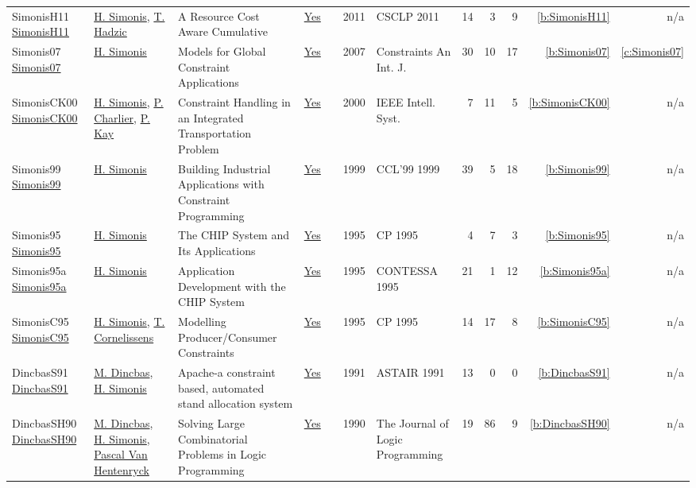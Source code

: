 {\begin{longtable}{>{\raggedright\arraybackslash}p{3cm}>{\raggedright\arraybackslash}p{6cm}>{\raggedright\arraybackslash}p{6.5cm}rrrp{2.5cm}rrrrr}
SimonisH11 \href{http://dx.doi.org/10.1007/978-3-642-19486-3_5}{SimonisH11} & \hyperref[auth:a17]{H. Simonis}, \hyperref[auth:a913]{T. Hadzic} & A Resource Cost Aware Cumulative & \href{../works/SimonisH11.pdf}{Yes} & \cite{SimonisH11} & 2011 & CSCLP 2011 & 14 & 3 & 9 & \ref{b:SimonisH11} & n/a\\
Simonis07 \href{https://doi.org/10.1007/s10601-006-9011-7}{Simonis07} & \hyperref[auth:a17]{H. Simonis} & Models for Global Constraint Applications & \href{../works/Simonis07.pdf}{Yes} & \cite{Simonis07} & 2007 & Constraints An Int. J. & 30 & 10 & 17 & \ref{b:Simonis07} & \ref{c:Simonis07}\\
SimonisCK00 \href{https://doi.org/10.1109/5254.820326}{SimonisCK00} & \hyperref[auth:a17]{H. Simonis}, \hyperref[auth:a893]{P. Charlier}, \hyperref[auth:a894]{P. Kay} & Constraint Handling in an Integrated Transportation Problem & \href{../works/SimonisCK00.pdf}{Yes} & \cite{SimonisCK00} & 2000 & {IEEE} Intell. Syst. & 7 & 11 & 5 & \ref{b:SimonisCK00} & n/a\\
Simonis99 \href{https://doi.org/10.1007/3-540-45406-3_6}{Simonis99} & \hyperref[auth:a17]{H. Simonis} & Building Industrial Applications with Constraint Programming & \href{../works/Simonis99.pdf}{Yes} & \cite{Simonis99} & 1999 & CCL'99 1999 & 39 & 5 & 18 & \ref{b:Simonis99} & n/a\\
Simonis95 \href{https://doi.org/10.1007/3-540-60299-2_42}{Simonis95} & \hyperref[auth:a17]{H. Simonis} & The {CHIP} System and Its Applications & \href{../works/Simonis95.pdf}{Yes} & \cite{Simonis95} & 1995 & CP 1995 & 4 & 7 & 3 & \ref{b:Simonis95} & n/a\\
Simonis95a \href{https://doi.org/10.1007/3-540-60794-3_11}{Simonis95a} & \hyperref[auth:a17]{H. Simonis} & Application Development with the {CHIP} System & \href{../works/Simonis95a.pdf}{Yes} & \cite{Simonis95a} & 1995 & CONTESSA 1995 & 21 & 1 & 12 & \ref{b:Simonis95a} & n/a\\
SimonisC95 \href{https://doi.org/10.1007/3-540-60299-2_27}{SimonisC95} & \hyperref[auth:a17]{H. Simonis}, \hyperref[auth:a305]{T. Cornelissens} & Modelling Producer/Consumer Constraints & \href{../works/SimonisC95.pdf}{Yes} & \cite{SimonisC95} & 1995 & CP 1995 & 14 & 17 & 8 & \ref{b:SimonisC95} & n/a\\
DincbasS91 \href{}{DincbasS91} & \hyperref[auth:a723]{M. Dincbas}, \hyperref[auth:a17]{H. Simonis} & Apache-a constraint based, automated stand allocation system & \href{../works/DincbasS91.pdf}{Yes} & \cite{DincbasS91} & 1991 & ASTAIR 1991 & 13 & 0 & 0 & \ref{b:DincbasS91} & n/a\\
DincbasSH90 \href{https://doi.org/10.1016/0743-1066(90)90052-7}{DincbasSH90} & \hyperref[auth:a723]{M. Dincbas}, \hyperref[auth:a17]{H. Simonis}, \hyperref[auth:a149]{Pascal Van Hentenryck} & Solving Large Combinatorial Problems in Logic Programming & \href{../works/DincbasSH90.pdf}{Yes} & \cite{DincbasSH90} & 1990 & The Journal of Logic Programming & 19 & 86 & 9 & \ref{b:DincbasSH90} & n/a\\
\end{longtable}
}

